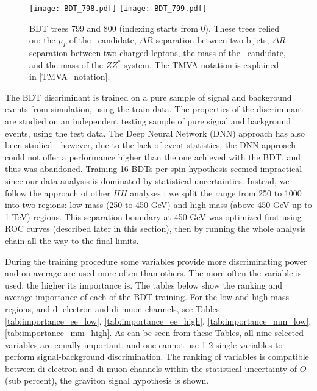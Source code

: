 \begin{figure}[H]
\begin{center}
\texttt{[image: BDT\_798.pdf]}
\texttt{[image: BDT\_799.pdf]}\\
\caption[BDT trees 799 and 800.]{BDT trees 799 and 800 (indexing starts from 0). These trees relied on: the $p_T$ of the \Zll~candidate, 
$\Delta R$ separation between two b jets,
$\Delta R$ separation between two charged leptons, 
the mass of the \HBB~candidate, and the mass of the $ZZ^*$ system. The TMVA notation is explained in \ref{TMVA_notation}.} 
\label{fig:bdt_trees_3}
\end{center}
\end{figure}

The BDT discriminant is trained on a pure sample of signal and background events from simulation, using the train data. The properties of the discriminant are studied on an independent testing sample of pure signal and background events, using the test data. The Deep Neural Network (DNN) approach has also been studied - however, due to the lack of event statistics, the DNN approach could not offer a performance higher than the one achieved with the BDT, and thus was abandoned. Training 16 BDTs per spin hypothesis seemed impractical since our data analysis is dominated by statistical uncertainties. Instead, we follow the approach of other $HH$ analyses \cite{HH_combination}: we split the range from 250 to 1000 into two regions: low mass (250 to 450 GeV) and high mass (above 450 GeV up to 1 TeV) regions. This separation boundary at 450 GeV was optimized first using ROC curves (described later in this section), then by running the whole analysis chain all the way to the final limits. %

During the training procedure some variables provide more discriminating power and on average are used more often than others. The more often the variable is used, the higher its importance is. The tables below show the ranking and average importance of each of the BDT training. For the low and high mass regions, and di-electron and di-muon channels, see Tables \ref{tab:importance_ee_low}, \ref{tab:importance_ee_high}, \ref{tab:importance_mm_low}, \ref{tab:importance_mm_high}. As can be seen from these Tables, all nine selected variables are equally important, and one cannot use 1-2 single variables to perform signal-background discrimination. The ranking of variables is compatible between di-electron and di-muon channels within the statistical uncertainty of $O$(sub percent), the graviton signal hypothesis is shown. 

